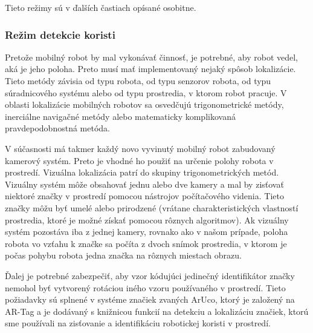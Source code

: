Tieto režimy sú v ďalších častiach opísané osobitne.

\subsubsection{Režim detekcie koristi}

Pretože mobilný robot by mal vykonávať činnosť, je potrebné, aby robot vedel, aká je jeho poloha. Preto musí
mať implementovaný nejaký spôsob lokalizácie. Tieto metódy závisia od typu robota, od typu senzorov robota, od typu
súradnicového systému alebo od typu prostredia, v ktorom robot pracuje. V oblasti lokalizácie mobilných robotov sa
osvedčujú trigonometrické metódy, inerciálne navigačné metódy alebo matematicky komplikovaná
pravdepodobnostná metóda.

\vspace{3mm}

\justifying
\noindent
V súčasnosti má takmer každý novo vyvinutý mobilný robot zabudovaný kamerový systém. Preto je vhodné
ho použiť na
určenie polohy robota v prostredí. Vizuálna lokalizácia patrí do skupiny trigonometrických metód. Vizuálny systém môže
obsahovať jednu alebo dve kamery a mal by zisťovať niektoré značky v prostredí pomocou nástrojov počítačového videnia. Tieto značky môžu byť umelé alebo prirodzené (vrátane charakteristických vlastností prostredia, ktoré je
možné získať pomocou rôznych algoritmov). Ak vizuálny systém pozostáva iba z jednej kamery, rovnako ako v našom prípade,
poloha robota vo vzťahu k
značke sa počíta z dvoch snímok prostredia, v ktorom je počas pohybu robota jedna značka na rôznych miestach obrazu.

\vspace{3mm}

\justifying
\noindent
Ďalej je potrebné zabezpečiť, aby vzor kódujúci jedinečný identifikátor značky nemohol byť vytvorený rotáciou iného
vzoru používaného v prostredí. Tieto požiadavky sú splnené v systéme značiek zvaných ArUco, ktorý je založený na
AR-Tag a je dodávaný s knižnicou funkcií na detekciu a lokalizáciu značiek, ktorú sme používali na zisťovanie a
identifikáciu robotickej koristi v prostredí.

\vspace{3mm}

